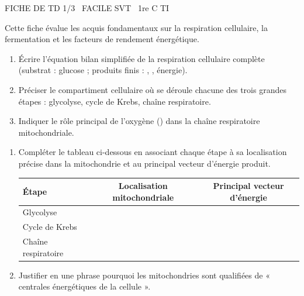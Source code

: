 \documentclass[11pt]{article}
\begin{document}
\begin{tcolorbox}[enhanced,colback=popink,colframe=popink,arc=10pt,boxrule=0pt,left=12pt,right=12pt,top=9pt,bottom=9pt]
{\color{white}\popxbold\small FICHE DE TD 1/3 \textbullet\ FACILE \hfill SVT \textbullet\ 1re C TI\par}
\end{tcolorbox}
\vspace{4pt}
Cette fiche évalue les acquis fondamentaux sur la respiration cellulaire, la fermentation et les facteurs de rendement énergétique.

\begin{exercice}
\begin{enumerate}
    \item Écrire l'équation bilan simplifiée de la respiration cellulaire complète (substrat : glucose ; produits finis : , , énergie).
    \item Préciser le compartiment cellulaire où se déroule chacune des trois grandes étapes : glycolyse, cycle de Krebs, chaîne respiratoire.
    \item Indiquer le rôle principal de l'oxygène () dans la chaîne respiratoire mitochondriale.
\end{enumerate}
\end{exercice}

\begin{exercice}
\begin{enumerate}
    \item Compléter le tableau ci-dessous en associant chaque étape à sa localisation précise dans la mitochondrie et au principal vecteur d'énergie produit.
    \begin{tabular}{|l|c|c|}
    \hline
    \textbf{Étape} & \textbf{Localisation mitochondriale} & \textbf{Principal vecteur d'énergie} \\
    \hline
    Glycolyse & & \\
    \hline
    Cycle de Krebs & & \\
    \hline
    Chaîne respiratoire & & \\
    \hline
    \end{tabular}
    \item Justifier en une phrase pourquoi les mitochondries sont qualifiées de « centrales énergétiques de la cellule ».
\end{enumerate}
\end{exercice}
\end{document}
